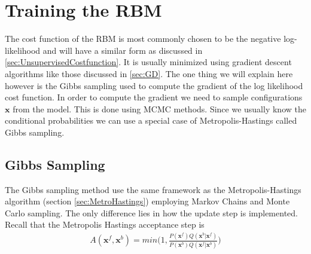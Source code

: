 \documentclass[twoside,english]{uiofysmaster}
\begin{document}
\begin{comment}
\subsubsection{Further analysis of the GB-RBM - the marginal prob as a MoG}

\subsection{Gaussian-something continuous RBM?}
If we use Gaussian latent variables and Gaussian visible variables, we get an undirected version of factor analysis. However, it turns out that it is identical to the standard directed version (Marks and Movellan 2001).
If we use Gaussian latent variables and categorical observed variables, we get an undirected version of categorical PCA (Section 27.2.2). In (Salakhutdinov et al. 2007), this was applied to the Netflix collaborative filtering problem, but was found to be significantly inferior to using binary latent variables, which have more expressive power. \cite{Murphy2012}
\end{comment}




\section{Training the RBM}

The cost function of the RBM is most commonly chosen to be the negative log-likelihood and will have a similar form as discussed in \ref{sec:UnsupervisedCostfunction}. It is usually minimized using gradient descent algorithms like those discussed in \ref{sec:GD}. The one thing we will explain here however is the Gibbs sampling used to compute the gradient of the log likelihood cost function. In order to compute the gradient we need to sample configurations $\bm{x}$ from the model. This is done using MCMC methods. Since we usually know the conditional probabilities we can use a special case of Metropolis-Hastings called Gibbs sampling.

\subsection{Gibbs Sampling}
The Gibbs sampling method use the same framework as the Metropolis-Hastings algorithm (section \ref{sec:MetroHastings}) employing Markov Chains and Monte Carlo sampling. The only difference lies in how the update step is implemented. 
Recall that the Metropolis Hastings acceptance step is
\begin{align}
	A(\bm{x}^f, \bm{x}^b) = min \Big(1,  \frac{  P(\bm{x}^f) Q(\bm{x}^b| \bm{x}^f) }
	{  P(\bm{x}^b) Q(\bm{x}^f| \bm{x}^b)  }  \Big)
\end{align}
\end{document}
